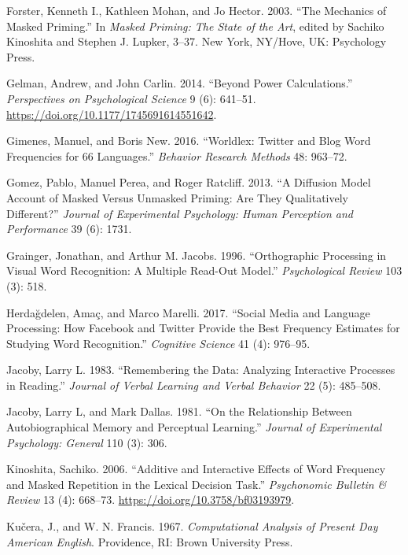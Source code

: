 \documentclass[
]{interact}
\newlength{\cslhangindent}
\newenvironment{CSLReferences}[2] %
 {\begin{list}{}{%
  \setlength{\itemindent}{0pt}
  \setlength{\leftmargin}{0pt}
  \setlength{\parsep}{0pt}
  \ifodd #1
   \setlength{\leftmargin}{\cslhangindent}
   \setlength{\itemindent}{-1\cslhangindent}
  \fi
  \setlength{\itemsep}{#2\baselineskip}}}
 {\end{list}}
\begin{document}
\begin{CSLReferences}{1}{0}
Forster, Kenneth I., Kathleen Mohan, and Jo Hector. 2003. {``The
Mechanics of Masked Priming.''} In \emph{Masked Priming: The State of
the Art}, edited by Sachiko Kinoshita and Stephen J. Lupker, 3--37. New
York, NY/Hove, UK: Psychology Press.

Gelman, Andrew, and John Carlin. 2014. {``Beyond Power Calculations.''}
\emph{Perspectives on Psychological Science} 9 (6): 641--51.
\url{https://doi.org/10.1177/1745691614551642}.

Gimenes, Manuel, and Boris New. 2016. {``Worldlex: Twitter and Blog Word
Frequencies for 66 Languages.''} \emph{Behavior Research Methods} 48:
963--72.

Gomez, Pablo, Manuel Perea, and Roger Ratcliff. 2013. {``A Diffusion
Model Account of Masked Versus Unmasked Priming: Are They Qualitatively
Different?''} \emph{Journal of Experimental Psychology: Human Perception
and Performance} 39 (6): 1731.

Grainger, Jonathan, and Arthur M. Jacobs. 1996. {``Orthographic
Processing in Visual Word Recognition: A Multiple Read-Out Model.''}
\emph{Psychological Review} 103 (3): 518.

Herdağdelen, Amaç, and Marco Marelli. 2017. {``Social Media and Language
Processing: How Facebook and Twitter Provide the Best Frequency
Estimates for Studying Word Recognition.''} \emph{Cognitive Science} 41
(4): 976--95.

Jacoby, Larry L. 1983. {``Remembering the Data: Analyzing Interactive
Processes in Reading.''} \emph{Journal of Verbal Learning and Verbal
Behavior} 22 (5): 485--508.

Jacoby, Larry L, and Mark Dallas. 1981. {``On the Relationship Between
Autobiographical Memory and Perceptual Learning.''} \emph{Journal of
Experimental Psychology: General} 110 (3): 306.

Kinoshita, Sachiko. 2006. {``Additive and Interactive Effects of Word
Frequency and Masked Repetition in the Lexical Decision Task.''}
\emph{Psychonomic Bulletin \& Review} 13 (4): 668--73.
\url{https://doi.org/10.3758/bf03193979}.

Kučera, J., and W. N. Francis. 1967. \emph{Computational Analysis of
Present Day American English}. Providence, RI: Brown University Press.


\end{CSLReferences}
\end{document}
